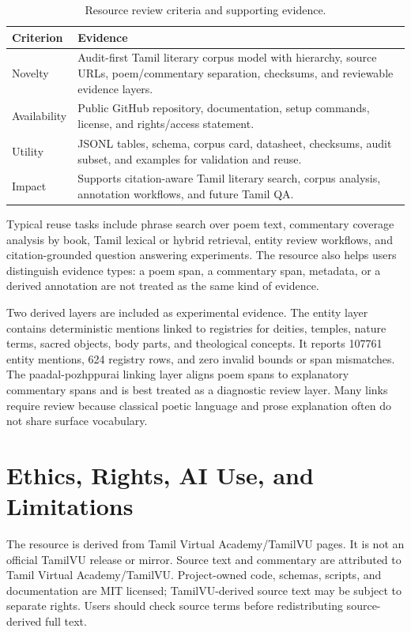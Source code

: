 \documentclass[sigconf]{acmart}
\begin{document}
\begin{table}[t]
  \caption{Resource review criteria and supporting evidence.}
  \label{tab:review}
  \centering
  \small
  \begin{tabular}{p{}p{}}
    \toprule
    Criterion & Evidence \\
    \midrule
    Novelty & Audit-first Tamil literary corpus model with hierarchy, source URLs, poem/commentary separation, checksums, and reviewable evidence layers. \\
    Availability & Public GitHub repository, documentation, setup commands, license, and rights/access statement. \\
    Utility & JSONL tables, schema, corpus card, datasheet, checksums, audit subset, and examples for validation and reuse. \\
    Impact & Supports citation-aware Tamil literary search, corpus analysis, annotation workflows, and future Tamil QA. \\
    \bottomrule
  \end{tabular}
\end{table}

Typical reuse tasks include phrase search over poem text, commentary coverage analysis by book, Tamil lexical or hybrid retrieval, entity review workflows, and citation-grounded question answering experiments. The resource also helps users distinguish evidence types: a poem span, a commentary span, metadata, or a derived annotation are not treated as the same kind of evidence.

Two derived layers are included as experimental evidence. The entity layer contains deterministic mentions linked to registries for deities, temples, nature terms, sacred objects, body parts, and theological concepts. It reports 107761 entity mentions, 624 registry rows, and zero invalid bounds or span mismatches. The paadal-pozhppurai linking layer aligns poem spans to explanatory commentary spans and is best treated as a diagnostic review layer. Many links require review because classical poetic language and prose explanation often do not share surface vocabulary.

\section{Ethics, Rights, AI Use, and Limitations}

The resource is derived from Tamil Virtual Academy/TamilVU pages. It is not an official TamilVU release or mirror. Source text and commentary are attributed to Tamil Virtual Academy/TamilVU. Project-owned code, schemas, scripts, and documentation are MIT licensed; TamilVU-derived source text may be subject to separate rights. Users should check source terms before redistributing source-derived full text.
\end{document}
